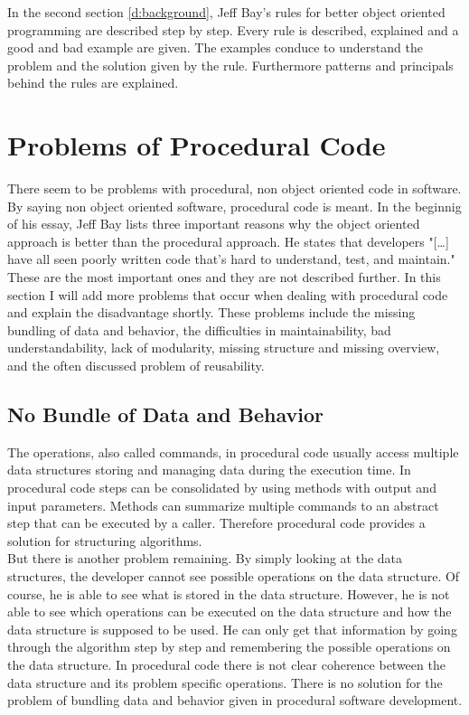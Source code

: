 In the second section \ref{d:background}, Jeff Bay's rules for better object oriented programming are described step by step. Every rule is described, explained and a good and bad example are given. The examples conduce to understand the problem and the solution given by the rule. Furthermore patterns and principals behind the rules are explained. 

\section{Problems of Procedural Code}
\label{d:problemsprocedural}
There seem to be problems with procedural, non object oriented code in software. By saying non object oriented software, procedural code is meant. In the beginnig of his essay, Jeff Bay lists three important reasons why the object oriented approach is better than the procedural approach. He states that developers "[\dots] have all seen poorly written code that's hard to understand, test, and maintain." \cite[p. 70]{oc2008} These are the most important ones and they are not described further. In this section I will add more problems that occur when dealing with procedural code and explain the disadvantage shortly. These problems include the missing bundling of data and behavior, the difficulties in maintainability, bad understandability, lack of modularity, missing structure and missing overview, and the often discussed problem of reusability.

\subsection*{No Bundle of Data and Behavior}
The operations, also called commands, in procedural code usually access multiple data structures storing and managing data during the execution time. In procedural code steps can be consolidated by using methods with output and input parameters. Methods can summarize multiple commands to an abstract step that can be executed by a caller. Therefore procedural code provides a solution for structuring algorithms.\\

But there is another problem remaining. By simply looking at the data structures, the developer cannot see possible operations on the data structure. Of course, he is able to see what is stored in the data structure. However, he is not able to see which operations can be executed on the data structure and how the data structure is supposed to be used. He can only get that information by going through the algorithm step by step and remembering the possible operations on the data structure. In procedural code there is not clear coherence between the data structure and its problem specific operations. There is no solution for the problem of bundling data and behavior given in procedural software development. \\

